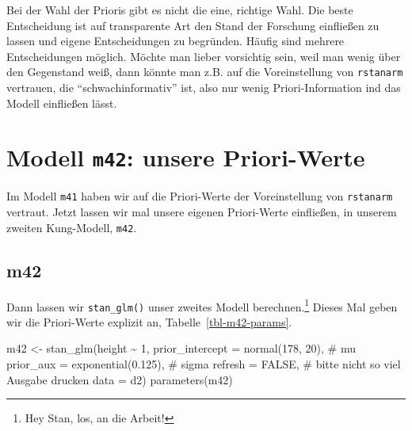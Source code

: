 \documentclass[
  a4paper,
  DIV=11]{scrreprt}
\newenvironment{Shaded}{\begin{snugshade}}{\end{snugshade}}
\newcommand{\AttributeTok}[1]{\textcolor[rgb]{0.40,0.45,0.13}{#1}}
\newcommand{\CommentTok}[1]{\textcolor[rgb]{0.37,0.37,0.37}{#1}}
\newcommand{\ConstantTok}[1]{\textcolor[rgb]{0.56,0.35,0.01}{#1}}
\newcommand{\DecValTok}[1]{\textcolor[rgb]{0.68,0.00,0.00}{#1}}
\newcommand{\FloatTok}[1]{\textcolor[rgb]{0.68,0.00,0.00}{#1}}
\newcommand{\FunctionTok}[1]{\textcolor[rgb]{0.28,0.35,0.67}{#1}}
\newcommand{\NormalTok}[1]{\textcolor[rgb]{0.00,0.23,0.31}{#1}}
\newcommand{\OtherTok}[1]{\textcolor[rgb]{0.00,0.23,0.31}{#1}}
\newcommand{\SpecialCharTok}[1]{\textcolor[rgb]{0.37,0.37,0.37}{#1}}
\theoremstyle{definition}
\theoremstyle{remark}
\begin{document}
\begin{tcolorbox}[enhanced jigsaw, leftrule=.75mm, left=2mm, bottomrule=.15mm, opacityback=0, coltitle=black, colbacktitle=quarto-callout-important-color!10!white, opacitybacktitle=0.6, rightrule=.15mm, toptitle=1mm, colback=white, colframe=quarto-callout-important-color-frame, arc=.35mm, toprule=.15mm, breakable, titlerule=0mm, bottomtitle=1mm, title=\textcolor{quarto-callout-important-color}{\faExclamation}\hspace{0.5em}{Wichtig}]
Bei der Wahl der Prioris gibt es nicht die eine, richtige Wahl. Die
beste Entscheidung ist auf transparente Art den Stand der Forschung
einfließen zu lassen und eigene Entscheidungen zu begründen. Häufig sind
mehrere Entscheidungen möglich. Möchte man lieber vorsichtig sein, weil
man wenig über den Gegenstand weiß, dann könnte man z.B. auf die
Voreinstellung von \texttt{rstanarm} vertrauen, die
``schwachinformativ'' ist, also nur wenig Priori-Information ind das
Modell einfließen lässt.
\end{tcolorbox}

\hypertarget{modell-m42-unsere-priori-werte}{%
\section{\texorpdfstring{Modell \texttt{m42}: unsere
Priori-Werte}{Modell m42: unsere Priori-Werte}}\label{modell-m42-unsere-priori-werte}}

Im Modell \texttt{m41} haben wir auf die Priori-Werte der Voreinstellung
von \texttt{rstanarm} vertraut. Jetzt lassen wir mal unsere eigenen
Priori-Werte einfließen, in unserem zweiten Kung-Modell, \texttt{m42}.

\hypertarget{m42}{%
\subsection{m42}\label{m42}}

Dann lassen wir \texttt{stan\_glm()} unser zweites Modell
berechnen.\footnote{Hey Stan, los, an die Arbeit!} Dieses Mal geben wir
die Priori-Werte explizit an, Tabelle~\ref{tbl-m42-params}.

\begin{Shaded}
\begin{Highlighting}[]
\NormalTok{m42 }\OtherTok{\textless{}{-}} 
  \FunctionTok{stan\_glm}\NormalTok{(height }\SpecialCharTok{\textasciitilde{}} \DecValTok{1}\NormalTok{, }
           \AttributeTok{prior\_intercept =} \FunctionTok{normal}\NormalTok{(}\DecValTok{178}\NormalTok{, }\DecValTok{20}\NormalTok{),  }\CommentTok{\# mu}
           \AttributeTok{prior\_aux =} \FunctionTok{exponential}\NormalTok{(}\FloatTok{0.125}\NormalTok{),  }\CommentTok{\# sigma}
           \AttributeTok{refresh =} \ConstantTok{FALSE}\NormalTok{,  }\CommentTok{\# bitte nicht so viel Ausgabe drucken}
           \AttributeTok{data =}\NormalTok{ d2)}
\FunctionTok{parameters}\NormalTok{(m42)}
\end{Highlighting}
\end{Shaded}
\end{document}
